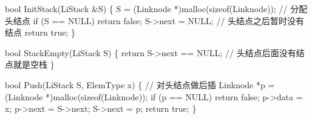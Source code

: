 \documentclass[10.5pt,a4paper,oneside]{article}
\newenvironment{Shaded}{}{}
\newcommand{\CommentTok}[1]{\textcolor[rgb]{0.18,0.55,0.23}{#1}}
\newcommand{\ControlFlowTok}[1]{\textcolor[rgb]{0.12,0.31,0.71}{#1}}
\newcommand{\DataTypeTok}[1]{\textcolor[rgb]{0.12,0.31,0.71}{#1}}
\newcommand{\KeywordTok}[1]{\textcolor[rgb]{0.12,0.31,0.71}{#1}}
\newcommand{\NormalTok}[1]{#1}
\newcommand{\OperatorTok}[1]{\textcolor[rgb]{0.20,0.20,0.20}{#1}}
\begin{document}
\begin{Shaded}
\begin{Highlighting}[]
\DataTypeTok{bool}\NormalTok{ InitStack}\OperatorTok{(}\NormalTok{LiStack }\OperatorTok{\&}\NormalTok{S}\OperatorTok{)} \OperatorTok{\{}
\NormalTok{    S }\OperatorTok{=} \OperatorTok{(}\NormalTok{Linknode }\OperatorTok{*)}\NormalTok{malloc}\OperatorTok{(}\KeywordTok{sizeof}\OperatorTok{(}\NormalTok{Linknode}\OperatorTok{));}   \CommentTok{// 分配头结点}
    \ControlFlowTok{if} \OperatorTok{(}\NormalTok{S }\OperatorTok{==}\NormalTok{ NULL}\OperatorTok{)} \ControlFlowTok{return} \KeywordTok{false}\OperatorTok{;}
\NormalTok{    S}\OperatorTok{{-}\textgreater{}}\NormalTok{next }\OperatorTok{=}\NormalTok{ NULL}\OperatorTok{;}                 \CommentTok{// 头结点之后暂时没有结点}
    \ControlFlowTok{return} \KeywordTok{true}\OperatorTok{;}
\OperatorTok{\}}

\DataTypeTok{bool}\NormalTok{ StackEmpty}\OperatorTok{(}\NormalTok{LiStack S}\OperatorTok{)} \OperatorTok{\{}
    \ControlFlowTok{return}\NormalTok{ S}\OperatorTok{{-}\textgreater{}}\NormalTok{next }\OperatorTok{==}\NormalTok{ NULL}\OperatorTok{;}         \CommentTok{// 头结点后面没有结点就是空栈}
\OperatorTok{\}}

\DataTypeTok{bool}\NormalTok{ Push}\OperatorTok{(}\NormalTok{LiStack S}\OperatorTok{,}\NormalTok{ ElemType x}\OperatorTok{)} \OperatorTok{\{}  \CommentTok{// 对头结点做后插}
\NormalTok{    Linknode }\OperatorTok{*}\NormalTok{p }\OperatorTok{=} \OperatorTok{(}\NormalTok{Linknode }\OperatorTok{*)}\NormalTok{malloc}\OperatorTok{(}\KeywordTok{sizeof}\OperatorTok{(}\NormalTok{Linknode}\OperatorTok{));}
    \ControlFlowTok{if} \OperatorTok{(}\NormalTok{p }\OperatorTok{==}\NormalTok{ NULL}\OperatorTok{)} \ControlFlowTok{return} \KeywordTok{false}\OperatorTok{;}
\NormalTok{    p}\OperatorTok{{-}\textgreater{}}\NormalTok{data }\OperatorTok{=}\NormalTok{ x}\OperatorTok{;}
\NormalTok{    p}\OperatorTok{{-}\textgreater{}}\NormalTok{next }\OperatorTok{=}\NormalTok{ S}\OperatorTok{{-}\textgreater{}}\NormalTok{next}\OperatorTok{;}
\NormalTok{    S}\OperatorTok{{-}\textgreater{}}\NormalTok{next }\OperatorTok{=}\NormalTok{ p}\OperatorTok{;}
    \ControlFlowTok{return} \KeywordTok{true}\OperatorTok{;}
\OperatorTok{\}}


\end{Highlighting}
\end{Shaded}
\end{document}
